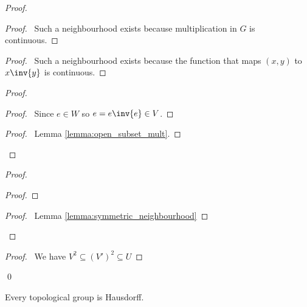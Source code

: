 \begin{proof}
    \pf
    \begin{proof}
        \pf\ Such a neighbourhood exists because multiplication in $G$ is continuous.
    \end{proof}
    \begin{proof}
        \pf\ Such a neighbourhood exists because the function that maps $(x,y)$ to $x \inv{y}$ is continuous.
    \end{proof}
    \begin{proof}
        \begin{proof}
            \pf\ Since $e \in W$ so $e = e \inv{e} \in V$.
        \end{proof}
        \begin{proof}
            \pf\ Lemma \ref{lemma:open_subset_mult}.
        \end{proof}
    \end{proof}
    \begin{proof}
        \begin{proof}
        \end{proof}
        \qedstep
        \begin{proof}
            \pf\ Lemma \ref{lemma:symmetric_neighbourhood}
        \end{proof}
    \end{proof}
    \begin{proof}
        \pf\ We have $V^2 \subseteq (V')^2 \subseteq U$
    \end{proof}
    \qed
\end{proof}

\begin{proposition}
    Every topological group is Hausdorff.
\end{proposition}


